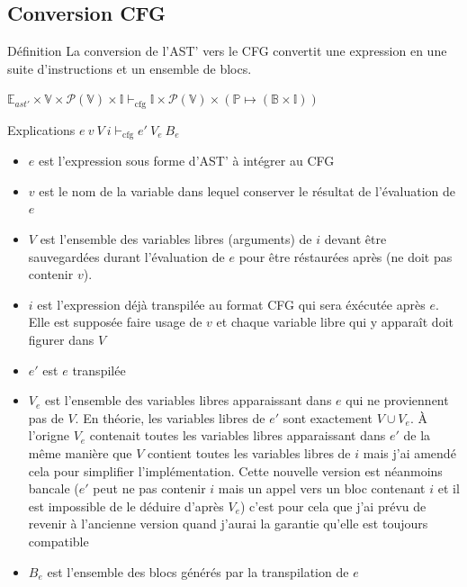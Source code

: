\documentclass{beamer}
\begin{document}
\subsection{Conversion CFG}

\begin{frame}{Définition}
    La conversion de l'AST' vers le CFG convertit une expression en une suite d'instructions et un ensemble de blocs.

    $\mathbb{E}_{ast'} \times \mathbb{V} \times \mathcal{P}(\mathbb{V}) \times \mathbb{I} \vdash_{\text{cfg}} \mathbb{I} \times \mathcal{P}(\mathbb{V}) \times (\mathbb{P} \mapsto (\mathbb{B} \times \mathbb{I}))$
\end{frame}

\begin{frame}{Explications}
    $e ~ v ~ V ~ i \vdash_{\text{cfg}} e' ~ V_e ~ B_e$
    \begin{itemize}
        \item $e$ est l'expression sous forme d'AST' à intégrer au CFG
        \item $v$ est le nom de la variable dans lequel conserver le résultat de l'évaluation de $e$
        \item $V$ est l'ensemble des variables libres (arguments) de $i$ devant être sauvegardées durant l'évaluation de $e$ pour être réstaurées après (ne doit pas contenir $v$).
        \item $i$ est l'expression déjà transpilée au format CFG qui sera éxécutée après $e$. Elle est supposée faire usage de $v$ et chaque variable libre qui y apparaît doit figurer dans $V$
        \item $e'$ est $e$ transpilée
        \item $V_e$ est l'ensemble des variables libres apparaissant dans $e$ qui ne proviennent pas de $V$. En théorie, les variables libres de $e'$ sont exactement $V \cup V_e$. À l'origne $V_e$ contenait toutes les variables libres apparaissant dans $e'$ de la même manière que $V$ contient toutes les variables libres de $i$ mais j'ai amendé cela pour simplifier l'implémentation. Cette nouvelle version est néanmoins bancale ($e'$ peut ne pas contenir $i$ mais un appel vers un bloc contenant $i$ et il est impossible de le déduire d'après $V_e$) c'est pour cela que j'ai prévu de revenir à l'ancienne version quand j'aurai la garantie qu'elle est toujours compatible
        \item $B_e$ est l'ensemble des blocs générés par la transpilation de $e$
    \end{itemize}
\end{frame}
\end{document}
